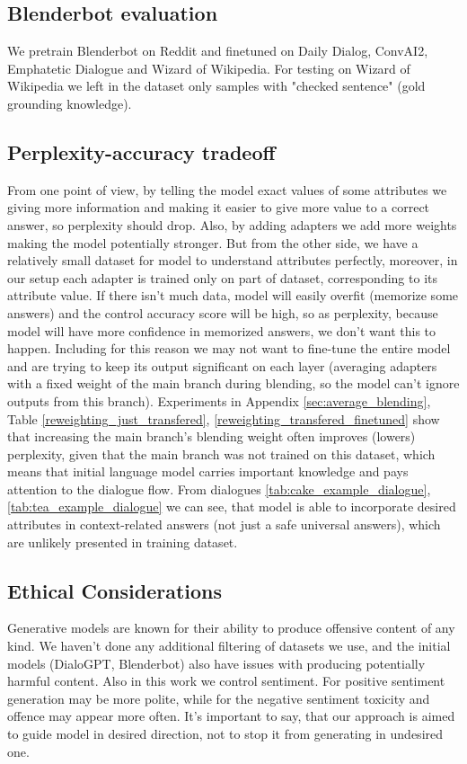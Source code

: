 \documentclass[11pt]{article}
\begin{document}
\subsection{Blenderbot evaluation}
\label{sec:blenderbot_evaluation}
We pretrain Blenderbot on Reddit and finetuned on Daily Dialog, ConvAI2, Emphatetic Dialogue and Wizard of Wikipedia.
For testing on Wizard of Wikipedia we left in the dataset only samples with "checked sentence"{} (gold grounding knowledge).

\subsection{Perplexity-accuracy tradeoff}
\label{sec:perplexity_accuracy_tradeoff}
From one point of view, by telling the model exact values of some attributes we giving more information and making it easier to give more value to a correct answer, so perplexity should drop. Also, by adding adapters we add more weights making the model potentially stronger. But from the other side, we have a relatively small dataset for model to understand attributes perfectly, moreover, in our setup each adapter is trained only on part of dataset, corresponding to its attribute value. If there isn't much data, model will easily overfit (memorize some answers) and the control accuracy score will be high, so as perplexity, because model will have more confidence in memorized answers, we don't want this to happen. Including for this reason we may not want to fine-tune the entire model and are trying to keep its output significant on each layer (averaging adapters with a fixed weight of the main branch during blending, so the model can't ignore outputs from this branch). Experiments in Appendix \ref{sec:average_blending}, Table \ref{reweighting_just_transfered}, \ref{reweighting_transfered_finetuned} show that increasing the main branch's blending weight often improves (lowers) perplexity, given that the main branch was not trained on this dataset, which means that initial language model carries important knowledge and pays attention to the dialogue flow. From dialogues \ref{tab:cake_example_dialogue}, \ref{tab:tea_example_dialogue} we can see, that model is able to incorporate desired attributes in context-related answers (not just a safe universal answers), which are unlikely presented in training dataset.

\subsection{Ethical Considerations}
\label{sec:ethical_considerations}
Generative models are known for their ability to produce offensive content of any kind. We haven't done any additional filtering of datasets we use, and the initial models (DialoGPT, Blenderbot) also have issues with producing potentially harmful content. Also in this work we control sentiment. For positive sentiment generation may be more polite, while for the negative sentiment toxicity and offence may appear more often. It's important to say, that our approach is aimed to guide model in desired direction, not to stop it from generating in undesired one.
\end{document}
